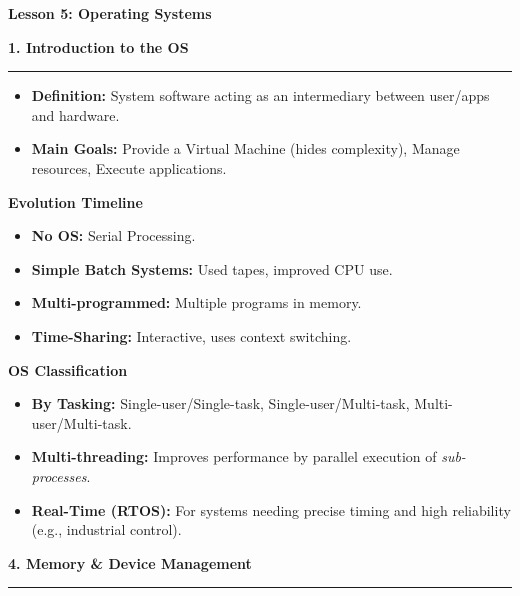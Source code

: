 \documentclass[a4paper, 8pt]{extarticle}
\newcommand{\sectionheading}[1]{\large\textbf{#1}\par\noindent\rule{\linewidth}{0.4pt}}
\newcommand{\subsectionheading}[1]{\normalsize\textbf{#1}}
\begin{document}
\pagestyle{empty} %

\begin{center}
    \fontsize{12pt}{14pt}\selectfont
    \textbf{Lesson 5: Operating Systems}
\end{center}
\vspace{1em}

\begin{multicols}{2}


\sectionheading{1. Introduction to the OS}
\vspace{0.5em}
\begin{itemize}
    \item \textbf{Definition:} System software acting as an intermediary between user/apps and hardware.
    \item \textbf{Main Goals:} Provide a Virtual Machine (hides complexity), Manage resources, Execute applications.
\end{itemize}

\subsectionheading{Evolution Timeline}
\begin{itemize}
    \item \textbf{No OS:} Serial Processing.
    \item \textbf{Simple Batch Systems:} Used tapes, improved CPU use.
    \item \textbf{Multi-programmed:} Multiple programs in memory.
    \item \textbf{Time-Sharing:} Interactive, uses context switching.
\end{itemize}

\subsectionheading{OS Classification}
\begin{itemize}
    \item \textbf{By Tasking:} Single-user/Single-task, Single-user/Multi-task, Multi-user/Multi-task.
    \item \textbf{Multi-threading:} Improves performance by parallel execution of \textit{sub-processes}.
    \item \textbf{Real-Time (RTOS):} For systems needing precise timing and high reliability (e.g., industrial control).
\end{itemize}

\vspace{1em}
\sectionheading{4. Memory \& Device Management}
\vspace{0.5em}


\end{multicols}
\end{document}
